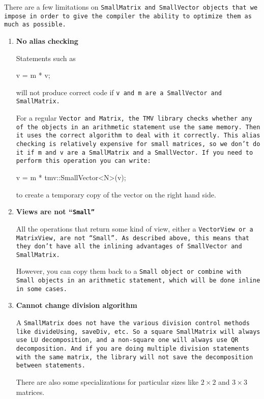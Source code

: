 There are a few limitations on \tt{SmallMatrix} and \tt{SmallVector} objects
that we impose in order to give the compiler the ability to
optimize them as much as possible.

\begin{enumerate}

\item
\textbf{No alias checking}

Statements such as 
\begin{tmvcode}
v = m * v;
\end{tmvcode}
will not produce correct code if \tt{v} and \tt{m} are a \tt{SmallVector} and \tt{SmallMatrix}.  

For a regular \tt{Vector} and \tt{Matrix}, the TMV library checks whether any of 
the objects in an arithmetic statement use the same memory.  
Then it uses the correct algorithm to deal with it 
correctly.  
This alias checking is relatively expensive for small matrices, so we don't do it if
\tt{m} and \tt{v} are a \tt{SmallMatrix} and a \tt{SmallVector}.  
If you need to perform this operation you can write:
\begin{tmvcode}
v = m * tmv::SmallVector<N>(v);
\end{tmvcode}
to create a temporary copy of the vector on the right hand side. 

\item
\textbf{Views are not ``\tt{Small}''}

All the operations that return some kind of view,
either a \tt{VectorView} or a \tt{MatrixView}, are not ``\tt{Small}''.
As described above, this means that they don't have all the inlining advantages of 
\tt{SmallVector} and \tt{SmallMatrix}.  

However, you can copy them back to a \tt{Small} object or combine
with \tt{Small} objects in an arithmetic statement, which will be done inline
in some cases.

\item
\textbf{Cannot change division algorithm}

A \tt{SmallMatrix} does not have the various division control methods 
like \tt{divideUsing}, \tt{saveDiv}, etc.
So a square \tt{SmallMatrix} will always use
LU decomposition, and a non-square one will always use QR decomposition.
And if you are doing multiple division statements with the same matrix,
the library will not save the decomposition between statements.  

There are also some specializations for particular sizes like $2 \times 2$ and $3 \times 3$
matrices.

\end{enumerate}

